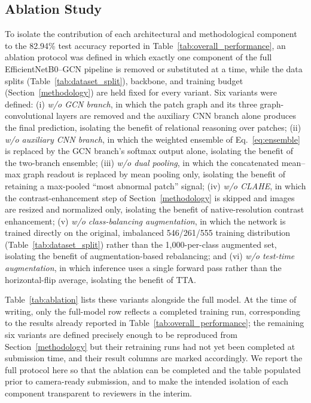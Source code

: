 \documentclass[conference]{IEEEtran}
\begin{document}
\subsection{Ablation Study}
\label{sec:ablation}
To isolate the contribution of each architectural and methodological component to the 82.94\% test accuracy reported in Table~\ref{tab:overall_performance}, an ablation protocol was defined in which exactly one component of the full EfficientNetB0--GCN pipeline is removed or substituted at a time, while the data splits (Table~\ref{tab:dataset_split}), backbone, and training budget (Section~\ref{methodology}) are held fixed for every variant. Six variants were defined: (i) \textit{w/o GCN branch}, in which the patch graph and its three graph-convolutional layers are removed and the auxiliary CNN branch alone produces the final prediction, isolating the benefit of relational reasoning over patches; (ii) \textit{w/o auxiliary CNN branch}, in which the weighted ensemble of Eq.~\ref{eq:ensemble} is replaced by the GCN branch's softmax output alone, isolating the benefit of the two-branch ensemble; (iii) \textit{w/o dual pooling}, in which the concatenated mean--max graph readout is replaced by mean pooling only, isolating the benefit of retaining a max-pooled ``most abnormal patch'' signal; (iv) \textit{w/o CLAHE}, in which the contrast-enhancement step of Section~\ref{methodology} is skipped and images are resized and normalized only, isolating the benefit of native-resolution contrast enhancement; (v) \textit{w/o class-balancing augmentation}, in which the network is trained directly on the original, imbalanced 546/261/555 training distribution (Table~\ref{tab:dataset_split}) rather than the 1,000-per-class augmented set, isolating the benefit of augmentation-based rebalancing; and (vi) \textit{w/o test-time augmentation}, in which inference uses a single forward pass rather than the horizontal-flip average, isolating the benefit of TTA.

Table~\ref{tab:ablation} lists these variants alongside the full model. At the time of writing, only the full-model row reflects a completed training run, corresponding to the results already reported in Table~\ref{tab:overall_performance}; the remaining six variants are defined precisely enough to be reproduced from Section~\ref{methodology} but their retraining runs had not yet been completed at submission time, and their result columns are marked accordingly. We report the full protocol here so that the ablation can be completed and the table populated prior to camera-ready submission, and to make the intended isolation of each component transparent to reviewers in the interim.
\end{document}
